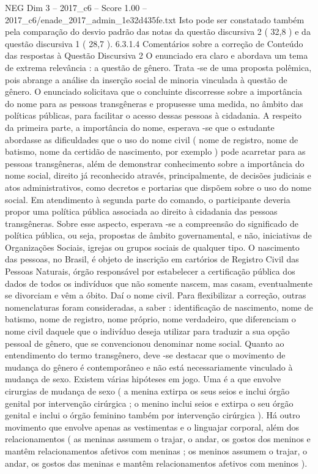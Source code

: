 \begin{textsample}{NEG Dim 3 – 2017\_c6 – Score 1.00 – 2017\_c6/enade\_2017\_admin\_1e32d435fe.txt}
Isto pode ser constatado também pela comparação do desvio padrão das notas da questão discursiva 2 ( 32,8 ) e da questão discursiva 1 ( 28,7 ). 6.3.1.4 Comentários sobre a correção de Conteúdo das respostas à Questão Discursiva 2 O enunciado era claro e abordava um tema de extrema relevância : a questão de gênero.
Trata -se de uma proposta polêmica, pois abrange a análise da inserção social de minoria vinculada à questão de gênero.
O enunciado solicitava que o concluinte discorresse sobre a importância do nome para as pessoas transgêneras e propusesse uma medida, no âmbito das políticas públicas, para facilitar o acesso dessas pessoas à cidadania.
A respeito da primeira parte, a importância do nome, esperava -se que o estudante abordasse as dificuldades que o uso do nome civil ( nome de registro, nome de batismo, nome da certidão de nascimento, por exemplo ) pode acarretar para as pessoas transgêneras, além de demonstrar conhecimento sobre a importância do nome social, direito já reconhecido através, principalmente, de decisões judiciais e atos administrativos, como decretos e portarias que dispõem sobre o uso do nome social.
Em atendimento à segunda parte do comando, o participante deveria propor uma política pública associada ao direito à cidadania das pessoas transgêneras.
Sobre esse aspecto, esperava -se a compreensão do significado de política pública, ou seja, propostas de âmbito governamental, e não, iniciativas de Organizações Sociais, igrejas ou grupos sociais de qualquer tipo.
O nascimento das pessoas, no Brasil, é objeto de inscrição em cartórios de Registro Civil das Pessoas Naturais, órgão responsável por estabelecer a certificação pública dos dados de todos os indivíduos que não somente nascem, mas casam, eventualmente se divorciam e vêm a óbito.
Daí o nome civil.
Para flexibilizar a correção, outras nomenclaturas foram consideradas, a saber : identificação de nascimento, nome de batismo, nome de registro, nome próprio, nome verdadeiro, que diferenciam o nome civil daquele que o indivíduo deseja utilizar para traduzir a sua opção pessoal de gênero, que se convencionou denominar nome social.
Quanto ao entendimento do termo transgênero, deve -se destacar que o movimento de mudança do gênero é contemporâneo e não está necessariamente vinculado à mudança de sexo.
Existem várias hipóteses em jogo.
Uma é a que envolve cirurgias de mudança de sexo ( a menina extirpa os seus seios e inclui órgão genital por intervenção cirúrgica ; o menino inclui seios e extirpa o seu órgão genital e inclui o órgão feminino também por intervenção cirúrgica ).
Há outro movimento que envolve apenas as vestimentas e o linguajar corporal, além dos relacionamentos ( as meninas assumem o trajar, o andar, os gostos dos meninos e mantêm relacionamentos afetivos com meninas ; os meninos assumem o trajar, o andar, os gostos das meninas e mantêm relacionamentos afetivos com meninos ).

\end{textsample}
